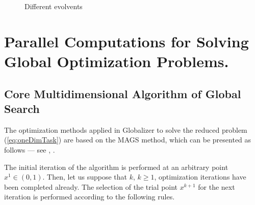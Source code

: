 \documentclass[runningheads]{llncs}
\begin{document}
\begin{figure}[ht]
    \centering
    \caption{Different evolvents}
\end{figure}

\section{Parallel Computations for Solving Global Optimization Problems.}
\subsection{Core Multidimensional Algorithm of Global Search}

The optimization methods applied in Globalizer to solve the reduced problem (\ref{eq:oneDimTask}) are based on the MAGS method, which can be presented as follows --- see \cite{strongin1978}, \cite{strSergGO}.
\par
The initial iteration of the algorithm is performed at an arbitrary point \mbox{\(x^1\in(0,1)\)}.
Then, let us suppose that \(k\), \(k\ge 1\), optimization iterations have been completed already.
The selection of the trial point \(x^{k+1}\) for the next iteration is performed according to the following rules.
\end{document}
